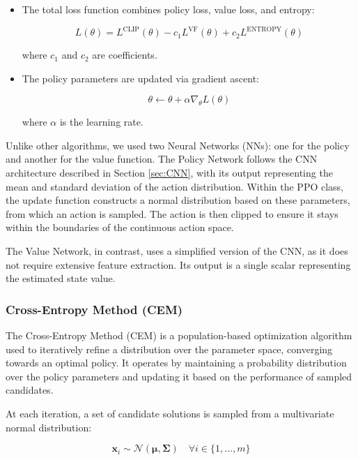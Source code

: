 \documentclass[../CSC_52081_EP.tex]{subfiles}
\begin{document}
\begin{itemize}
    \item The total loss function combines policy loss, value loss, and entropy:

    \[
    L(\theta) = L^{\text{CLIP}}(\theta) - c_1 L^{\text{VF}}(\theta) + c_2 L^{\text{ENTROPY}}(\theta)
    \]

    where \( c_1 \) and \( c_2 \) are coefficients.

    \item The policy parameters are updated via gradient ascent:

    \[
    \theta \leftarrow \theta + \alpha \nabla_{\theta} L(\theta)
    \]

    where \( \alpha \) is the learning rate.

\end{itemize}

Unlike other algorithms, we used two Neural Networks (NNs): one for the policy and another for the value function. The Policy Network follows the CNN architecture described in Section \ref{sec:CNN}, with its output representing the mean and standard deviation of the action distribution. Within the PPO class, the update function constructs a normal distribution based on these parameters, from which an action is sampled. The action is then clipped to ensure it stays within the boundaries of the continuous action space.

The Value Network, in contrast, uses a simplified version of the CNN, as it does not require extensive feature extraction. Its output is a single scalar representing the estimated state value.

\hspace{1cm}
\subsubsection{Cross-Entropy Method (CEM)}

The Cross-Entropy Method (CEM) is a population-based optimization algorithm used to iteratively refine a distribution over the parameter space, converging towards an optimal policy. It operates by maintaining a probability distribution over the policy parameters and updating it based on the performance of sampled candidates.

At each iteration, a set of candidate solutions is sampled from a multivariate normal distribution:

\begin{equation}
\boldsymbol{x}_i \sim \mathcal{N}(\boldsymbol{\mu}, \boldsymbol{\Sigma}) \quad \forall i \in \{1, \dots, m\}
\end{equation}
\end{document}
